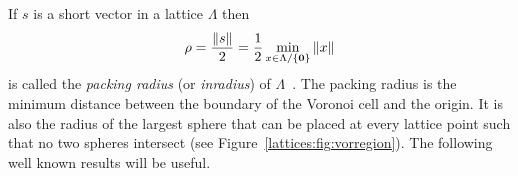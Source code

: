 \documentclass[final,leqno]{siamltex}
\begin{document}

If $s$ is a short vector in a lattice $\Lambda$ then 
\[
\rho = \frac{\|s\|}{2} = \frac{1}{2} \min_{x \in \Lambda / \{\boldsymbol{0}\} } \|x\|
\]
is called the \emph{packing radius} (or \emph{inradius}) of $\Lambda$~\cite{SPLAG}.  The packing radius is the minimum distance between the boundary of the Voronoi cell and the origin.  It is also the radius of the largest sphere that can be placed at every lattice point such that no two spheres intersect (see Figure~\ref{lattices:fig:vorregion}).  The following well known results will be useful.

\end{document}
